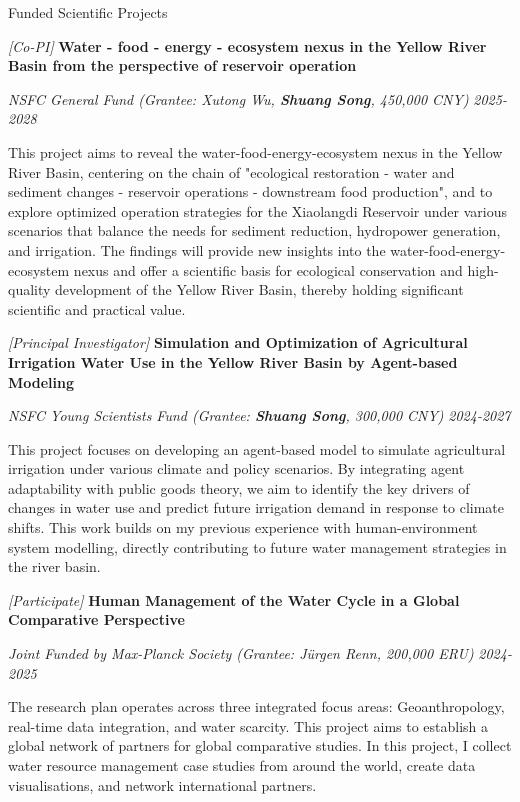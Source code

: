 \documentclass{resume} %
\begin{document}


\begin{rSection}{Funded Scientific Projects}

\textit{[Co-PI]} {\bf Water - food - energy - ecosystem nexus in the Yellow River Basin from the perspective of reservoir operation}

\textnormal{\em NSFC General Fund (Grantee: Xutong Wu, \textbf{Shuang Song}, 450,000 CNY)} \hfill {\em 2025-2028}

This project aims to reveal the water-food-energy-ecosystem nexus in the Yellow River Basin, centering on the chain of "ecological restoration - water and sediment changes - reservoir operations - downstream food production", and to explore optimized operation strategies for the Xiaolangdi Reservoir under various scenarios that balance the needs for sediment reduction, hydropower generation,
and irrigation. The findings will provide new insights into the
water-food-energy-ecosystem nexus and offer a scientific basis for ecological conservation and high-quality development of the Yellow River Basin, thereby holding significant scientific and practical value.

\textit{[Principal Investigator]} {\bf Simulation and Optimization of Agricultural Irrigation Water Use in the Yellow River Basin by Agent-based Modeling}

\textnormal{\em NSFC Young Scientists Fund (Grantee: \textbf{Shuang Song}, 300,000 CNY)} \hfill {\em 2024-2027}

This project focuses on developing an agent-based model to simulate agricultural irrigation under various climate and policy scenarios. By integrating agent adaptability with public goods theory, we aim to identify the key drivers of changes in water use and predict future irrigation demand in response to climate shifts. This work builds on my previous experience with human-environment system modelling, directly contributing to future water management strategies in the river basin.

\textit{[Participate]} {\bf Human Management of the Water Cycle in a Global Comparative Perspective}

\textnormal{\em Joint Funded by Max-Planck Society (Grantee: Jürgen Renn, 200,000 ERU)} \hfill {\em 2024-2025}

The research plan operates across three integrated focus areas: Geoanthropology,
real-time data integration, and water scarcity. This project aims to establish a global network of partners for global comparative studies. In this project, I collect water resource management case studies from around the world, create data visualisations, and network international partners.


\end{rSection}
\end{document}

